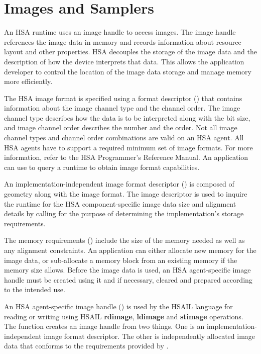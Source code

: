 \documentclass[final,oneside]{book}
\newcommand{\reffun}[1]{\textbf{#1}}
\newcommand{\refhsl}[1]{\reffun{#1}}
\begin{document}
\section{Images and Samplers}\label{images}

An HSA runtime uses an image handle  to access
images. The image handle references the image data in memory and records
information about resource layout and other properties. HSA decouples the
storage of the image data and the description of how the device interprets that
data. This allows the application developer to control the location of the
image data storage and manage memory more efficiently.

The HSA image format is specified using a format descriptor
() that contains information about the image
channel type and the channel order. The image channel type describes how the
data is to be interpreted along with the bit size, and image channel order
describes the number and the order. Not all image channel types and channel
order combinations are valid on an HSA agent. All HSA agents have to support a
required minimum set of image formats. For more information, refer to the HSA
Programmer's Reference Manual\cite{prm}. An application can use
 to query a runtime
to obtain image format capabilities.

An implementation-independent image format descriptor
() is composed of geometry along with the
image format. The image descriptor is used to inquire the runtime for the HSA
component-specific image data size and alignment details by calling
 for the purpose of determining the
implementation's storage requirements.

The memory requirements () include the size of the
memory needed as well as any alignment constraints. An application can either
allocate new memory for the image data, or sub-allocate a memory block from an
existing memory if the memory size allows. Before the image data is used, an HSA
agent-specific image handle must be created using it and if necessary, cleared
and prepared according to the intended use.

An HSA agent-specific image handle () is used by
the HSAIL language for reading or writing using HSAIL \refhsl{rdimage},
\refhsl{ldimage} and \refhsl{stimage} operations. The function
 creates an image handle from two things.
One is an implementation-independent image format descriptor. The other is
independently allocated image data that conforms to the requirements provided
by .
\end{document}
